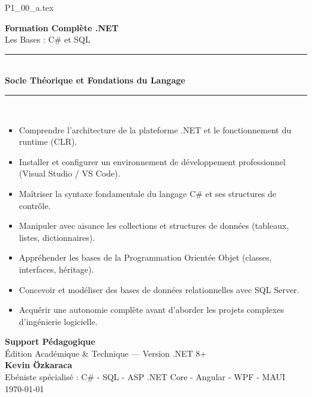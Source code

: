 
\begin{titlepage}
    {\raggedleft \tiny\color{gray}P1\_00\_a.tex \par}
    \centering
    \vspace*{1.5cm}
    
    {\Huge \bfseries Formation Complète .NET} \\[0.5cm]
    {\huge \color{keywordcolor} Les Bases : C\# et SQL} \\[1.5cm]
    
    \rule{\linewidth}{0.5mm} \\[0.4cm]
    {\Large \bfseries Socle Théorique et Fondations du Langage} \\[0.4cm]
    \rule{\linewidth}{0.5mm} \\[1.5cm]
    
    \begin{tcolorbox}[colback=backcolour,colframe=keywordcolor,title=\textbf{Objectifs du Module}]
        \begin{itemize}[leftmargin=*]
            \item Comprendre l'architecture de la plateforme .NET et le fonctionnement du runtime (CLR).
        \item Installer et configurer un environnement de développement professionnel (Visual Studio / VS Code).
        \item Maîtriser la syntaxe fondamentale du langage C\# et ses structures de contrôle.
        \item Manipuler avec aisance les collections et structures de données (tableaux, listes, dictionnaires).
        \item Appréhender les bases de la Programmation Orientée Objet (classes, interfaces, héritage).
        \item Concevoir et modéliser des bases de données relationnelles avec SQL Server.
        \item Acquérir une autonomie complète avant d'aborder les projets complexes d'ingénierie logicielle.
        \end{itemize}
    \end{tcolorbox}
    
    \vfill
    
    {\large \textbf{Support Pédagogique}} \\
    {\small Édition Académique \& Technique — Version .NET 8+} \\[1cm]

    {\large \textbf{Kevin Özkaraca}} \\
    {\small Ebéniste spécialisé : C\# - SQL - ASP .NET Core - Angular - WPF - MAUI} \\[1cm]
    
    \today
\end{titlepage}

\newpage
